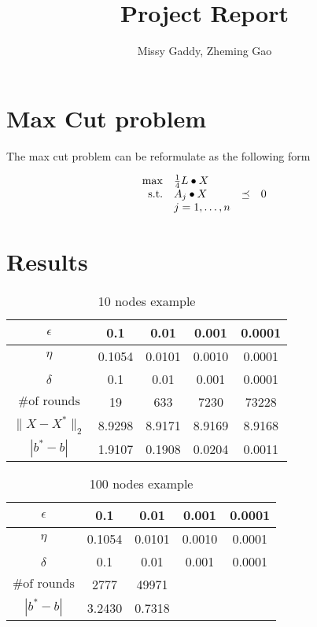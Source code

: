 \documentclass[12pt]{article}
\begin{document}
 
 
\title{Project Report}
\author{Missy Gaddy, Zheming Gao}
\maketitle

\section{Max Cut problem}

The max cut problem can be reformulate as the following form

\begin{equation}
\begin{array}{r l l l}
\max & \frac{1}{4} L \bullet X & & \\
\text{s.t.} & A_j \bullet X & \preceq & 0 \\
& j = 1,\dots, n & &
\end{array}
\end{equation}




\section{Results}

\begin{table}[htbp]\label{10nodestable}
\centering

\begin{tabular}{||c|c|c|c|c||}
\hline
$\epsilon$ & 0.1 & 0.01 & 0.001 & 0.0001 \\
\hline
$\eta$ & 0.1054 & 0.0101 & 0.0010 & 0.0001 \\
\hline
$\delta$ & 0.1 & 0.01 & 0.001 & 0.0001 \\
\hline
$\text{\# of rounds}$ & 19 & 633 & 7230 & 73228 \\
\hline
$\|X - X^*\|_2$ & 8.9298 & 8.9171 & 8.9169 & 8.9168 \\
\hline
$|b^* - b|$ & 1.9107 & 0.1908 & 0.0204 & 0.0011 \\
\hline
\end{tabular}
\caption{10 nodes example}
\end{table}

\begin{table}[htbp]\label{100nodestable}
\centering

\begin{tabular}{||c|c|c|c|c||}
\hline
$\epsilon$ & 0.1 & 0.01 & 0.001 & 0.0001 \\
\hline
$\eta$ & 0.1054 & 0.0101 & 0.0010 & 0.0001 \\
\hline
$\delta$ & 0.1 & 0.01 & 0.001 & 0.0001 \\
\hline
$\text{\# of rounds}$ & 2777 & 49971 &  & \\
\hline
$|b^* - b|$ & 3.2430 & 0.7318 &  & \\
\hline
\end{tabular}
\caption{100 nodes example}
\end{table}
\end{document}
